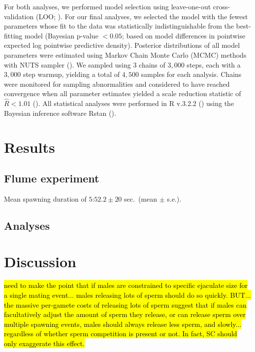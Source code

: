 \documentclass{article}
\begin{document}
	For both analyses, we performed model selection using leave-one-out cross-validation (LOO; \citealt{Vehtari2016}). For our final analyses, we selected the model with the fewest parameters whose fit to the data was statistically indistinguishable from the best-fitting model (Bayesian p-value $< 0.05$; based on model differences in pointwise expected log pointwise predictive density). Posterior distributions of all model parameters were estimated using Markov Chain Monte Carlo (MCMC) methods with NUTS sampler (\citealt{Stan2016}). We sampled using $3$ chains of $3,000$ steps, each with a $3,000$ step warmup, yielding a total of $4,500$ samples for each analysis. Chains were monitored for sampling abnormalities and considered to have reached convergence when all parameter estimates yielded a scale reduction statistic of $\hat{R} < 1.01$ (\citealt{GelmanRubin1992}). All statistical analyses were performed in R v.3.2.2 (\citealt{R2016}) using the Bayesian inference software Rstan (\citealt{Stan2016}).

\section*{Results}

	\subsection*{Flume experiment}

	Mean spawning duration of $5$:$52.2 \pm 20$ sec.~(mean $\pm$ s.e.).

	\subsection*{Analyses}


\section*{Discussion}

\hl{need to make the point that if males are constrained to specific ejaculate size for a single mating event... males releasing lots of sperm should do so quickly.  BUT... the massive per-gamete costs of releasing lots of sperm suggest that if males can facultatively adjust the amount of sperm they release, or can release sperm over multiple spawning events, males should always release less sperm, and slowly... regardless of whether sperm competition is present or not. In fact, SC should only exaggerate this effect.}
\end{document}
